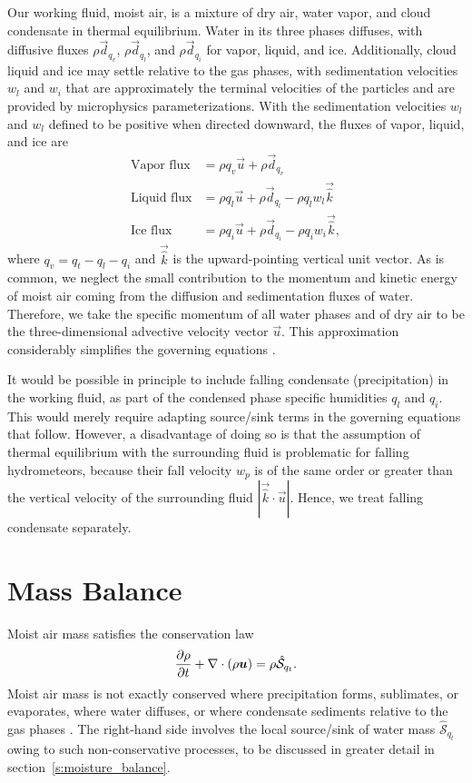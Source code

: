 \documentclass{report}
\begin{document}
Our working fluid, moist air, is a mixture of dry air, water vapor, and cloud condensate in thermal equilibrium. Water in its three phases diffuses, with diffusive fluxes $\rho \vec{d}_{q_v}$, $\rho \vec{d}_{q_l}$, and $\rho \vec{d}_{q_i}$ for vapor, liquid, and ice. Additionally, cloud liquid and ice may settle relative to the gas phases, with sedimentation velocities $w_l$ and $w_i$ that are approximately the terminal velocities of the particles and are provided by microphysics parameterizations. With the sedimentation velocities $w_l$ and $w_l$ defined to be positive when directed downward, the fluxes of vapor, liquid, and ice are
\begin{subequations}
\begin{align}
    \text{Vapor flux}  &= \rho q_v \vec{u}  + \rho \vec{d}_{q_v}\\
    \text{Liquid flux}  &= \rho q_l \vec{u}  + \rho \vec{d}_{q_l} - \rho q_l w_l  \vec{\hat k}\\
    \text{Ice flux} &= \rho q_i \vec{u} + \rho \vec{d}_{q_i} - \rho q_i w_i  \vec{\hat k},
\end{align}
\end{subequations}
where $q_v = q_t - q_l - q_i$ and $\vec{\hat k}$ is the upward-pointing vertical unit vector. As is common, we neglect the small contribution to the momentum and kinetic energy of moist air coming from the diffusion and sedimentation fluxes of water. Therefore, we take the specific momentum of all water phases and of dry air to be the three-dimensional advective velocity vector $\vec{u}$. This approximation considerably simplifies the governing equations \citep{Romps08a}.

It would be possible in principle to include falling condensate (precipitation) in the working fluid, as part of the condensed phase specific humidities $q_l$ and $q_i$. This would merely require adapting source/sink terms in the governing equations that follow. However, a disadvantage of doing so is that the assumption of thermal equilibrium with the surrounding fluid is problematic for falling hydrometeors, because their fall velocity $w_{p}$ is of the same order or greater than the vertical velocity of the surrounding fluid $|\vec{\hat k} \cdot \vec{u}|$. Hence, we treat falling condensate separately.

\section{Mass Balance}

Moist air mass satisfies the conservation law
\begin{equation}
\frac{\partial \rho}{\partial t} + \nabla \cdot (\rho\boldsymbol{{u}}) = \rho \mathcal{\hat S}_{q_t}.
\label{eq:governing_equations/mass}
\end{equation}
Moist air mass is not exactly conserved where precipitation forms, sublimates, or evaporates, where water diffuses, or where condensate sediments relative to the gas phases \citep{Bott08a, Romps08a}. The  right-hand side involves the local source/sink of water mass $\mathcal{\hat S}_{q_t}$ owing to such non-conservative processes, to be discussed in greater detail in section~\ref{s:moisture_balance}.
\end{document}
